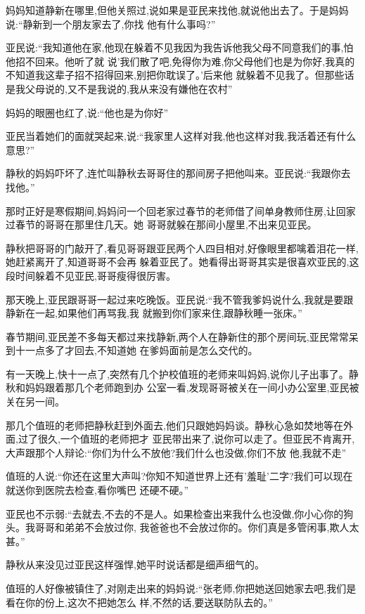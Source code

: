 ﻿\documentclass[12pt]{article}
\begin{document}
妈妈知道静新在哪里,但他关照过,说如果是亚民来找他,就说他出去了。于是妈妈说:``静新到一个朋友家去了,你找
他有什么事吗?''

亚民说:``我知道他在家,他现在躲着不见我\myrule 因为我告诉他我父母不同意我们的事,怕他招不回来。他听了就
说'我们散了吧,免得你为难,你父母他们也是为你好,我真的不知道我这辈子招不招得回来,别把你耽误了。'后来他
就躲着不见我了。但那些话是我父母说的,又不是我说的,我从来没有嫌他在农村\myrule ''

妈妈的眼圈也红了,说:``他也是为你好\myrule ''

亚民当着她们的面就哭起来,说:``我家里人这样对我,他也这样对我,我活着还有什么意思?''

静秋的妈妈吓坏了,连忙叫静秋去哥哥住的那间房子把他叫来。亚民说:``我跟你去找他。''

那时正好是寒假期间,妈妈问一个回老家过春节的老师借了间单身教师住房,让回家过春节的哥哥在那里住几天。她
哥哥就躲在那间小屋里,不出来见亚民。

静秋把哥哥的门敲开了,看见哥哥跟亚民两个人四目相对,好像眼里都噙着泪花一样,她赶紧离开了,知道哥哥不会再
躲着亚民了。她看得出哥哥其实是很喜欢亚民的,这段时间躲着不见亚民,哥哥瘦得很厉害。

那天晚上,亚民跟哥哥一起过来吃晚饭。亚民说:``我不管我爹妈说什么,我就是要跟静新在一起,如果他们再骂我,我
就搬到你们家来住,跟静秋睡一张床。''

春节期间,亚民差不多每天都过来找静新,两个人在静新住的那个房间玩,亚民常常呆到十一点多了才回去,不知道她
在爹妈面前是怎么交代的。

有一天晚上,快十一点了,突然有几个护校值班的老师来叫妈妈,说你儿子出事了。静秋和妈妈跟着那几个老师跑到办
公室一看,发现哥哥被关在一间小办公室里,亚民被关在另一间。

那几个值班的老师把静秋赶到外面去,他们只跟她妈妈谈。静秋心急如焚地等在外面,过了很久,一个值班的老师把才
亚民带出来了,说你可以走了。但亚民不肯离开,大声跟那个人辩论:``你们为什么不放他?我们什么也没做,你们不放
他,我就不走\myrule ''

值班的人说:``你还在这里大声叫?你知不知道世界上还有'羞耻'二字?我们可以现在就送你到医院去检查,看你嘴巴
还硬不硬。''

亚民也不示弱:``去就去,不去的不是人。如果检查出来我什么也没做,你小心你的狗头。我哥哥和弟弟不会放过你,
我爸爸也不会放过你的。你们真是多管闲事,欺人太甚。''

静秋从来没见过亚民这样强悍,她平时说话都是细声细气的。

值班的人好像被镇住了,对刚走出来的妈妈说:``张老师,你把她送回她家去吧,我们是看在你的份上,这次不把她怎么
样,不然的话,要送联防队去的。''
\end{document}
